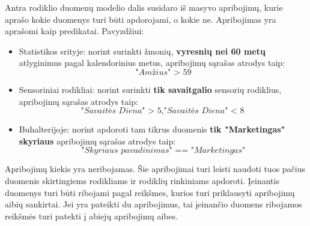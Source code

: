\documentclass{VUMIFPSbakalaurinis}
\begin{document}
Antra rodiklio duomenų modelio dalis susidaro iš masyvo apribojimų, kurie aprašo kokie duomenys turi būti apdorojami, o kokie ne. Apribojimas yra aprašomi kaip predikatai.
Pavyzdžiui:
\begin{itemize}
    \item Statistikos srityje: norint surinkti žmonių, \textbf{vyresnių nei 60 metų} atlyginimus pagal kalendorinius metus, apribojimų sąrašas atrodys taip: \[\textit{"Amžius" > 59}\]
    \item Sensoriniai rodikliai: norint surinkti \textbf{tik savaitgalio} sensorių rodiklius, apribojimų sąrašas atrodys taip: \[\textit{"Savaitės Diena" > 5}, \textit{"Savaitės Diena" < 8}\]
    \item Buhalterijoje: norint apdoroti tam tikrus duomenis \textbf{tik "Marketingas" skyriaus} apribojimų sąrašas atrodys taip: \[\textit{"Skyriaus pavadinimas" == "Marketingas"}\] 
\end{itemize}  
Apribojimų kiekis yra neribojamas. Šie apribojimai turi leisti naudoti tuos pačius duomenis skirtingiems rodikliams ir rodiklių rinkiniams apdoroti. Įeinantis duomenys turi būti ribojami pagal reikšmes, kurios turi priklausyti apribojimų aibių sankirtai. Jei yra pateikti du apribojimus, tai įeinančio duomens ribojamos reikšmės turi patekti į abiejų apribojimų aibes. 
\par
\end{document}
